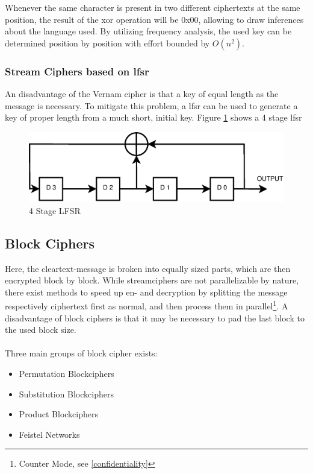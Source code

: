 Whenever the same character is present in two different ciphertexts at the same position, the result of the xor operation will be 0x00, allowing to draw
inferences about the language used. By utilizing frequency analysis, the used key can be determined position by position with effort bounded by $O(n^2)$.

\subsubsection{Stream Ciphers based on \gls{lfsr}}

An disadvantage of the Vernam cipher is that a key of equal length as the message is necessary. To mitigate this problem, a \gls{lfsr} can be used to generate
a key of proper length from a much short, initial key. Figure \ref{fig:lsfr} shows a 4 stage \gls{lfsr}

\begin{figure}
    \centering
    \includegraphics[width=1\textwidth]{figures/LSFR}
    \caption{4 Stage LFSR}
    \label{fig:lsfr}
\end{figure}


\subsection{Block Ciphers}

Here, the cleartext-message is broken into equally sized parts, which are then encrypted block by block. While streamciphers are not parallelizable
by nature, there exist methods to speed up en- and decryption by splitting the message respectively ciphertext first as normal, and then process them in
parallel\footnote{Counter Mode, see \ref{confidentiality}}. A disadvantage of block ciphers is that it may be necessary to pad the last block to the used block size. 
\\
\\
Three main groups of block cipher exists:
\begin{itemize}
 \item Permutation Blockciphers
 \item Substitution Blockciphers
 \item Product Blockciphers
 \item Feistel Networks
\end{itemize}

